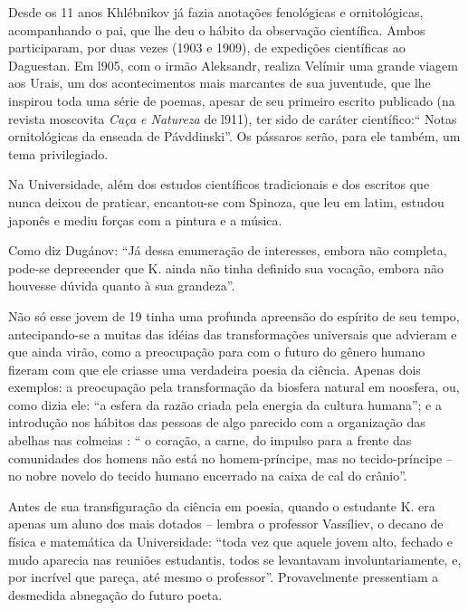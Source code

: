 Desde os 11 anos Khlébnikov já fazia anotações fenológicas e
ornitológicas, acompanhando o pai, que lhe deu o hábito da observação
científica. Ambos participaram, por duas vezes (1903 e 1909), de
expedições científicas ao Daguestan. Em l905, com o irmão Aleksandr,
realiza Velímir uma grande viagem aos Urais, um dos acontecimentos mais
marcantes de sua juventude, que lhe inspirou toda uma série de poemas,
apesar de seu primeiro escrito publicado (na revista moscovita
\emph{Caça e Natureza} de l911), ter sido de caráter científico:`` Notas
ornitológicas da enseada de Pávddinski''. Os pássaros serão, para ele
também, um tema privilegiado.

Na Universidade, além dos estudos científicos tradicionais e dos
escritos que nunca deixou de praticar, encantou-se com Spinoza, que leu
em latim, estudou japonês e mediu forças com a pintura e a música.

Como diz Dugánov: ``Já dessa enumeração de interesses, embora não
completa, pode-se depreeender que K. ainda não tinha definido sua
vocação, embora não houvesse dúvida quanto à sua grandeza''.

Não só esse jovem de 19 tinha uma profunda apreensão do espírito de seu
tempo, antecipando-se a muitas das idéias das transformações universais
que advieram e que ainda virão, como a preocupação para com o futuro do
gênero humano fizeram com que ele criasse uma verdadeira poesia da
ciência. Apenas dois exemplos: a preocupação pela transformação da
biosfera natural em noosfera, ou, como dizia ele: ``a esfera da razão
criada pela energia da cultura humana''; e a introdução nos hábitos das
pessoas de algo parecido com a organização das abelhas nas colmeias : ``
o coração, a carne, do impulso para a frente das comunidades dos homens
não está no homem-príncipe, mas no tecido-príncipe -- no nobre novelo do
tecido humano encerrado na caixa de cal do crânio''.

Antes de sua transfiguração da ciência em poesia, quando o estudante K.
era apenas um aluno dos mais dotados -- lembra o professor Vassíliev, o
decano de física e matemática da Universidade: ``toda vez que aquele
jovem alto, fechado e mudo aparecia nas reuniões estudantis, todos se
levantavam involuntariamente, e, por incrível que pareça, até mesmo o
professor''. Provavelmente pressentiam a desmedida abnegação do futuro
poeta.

